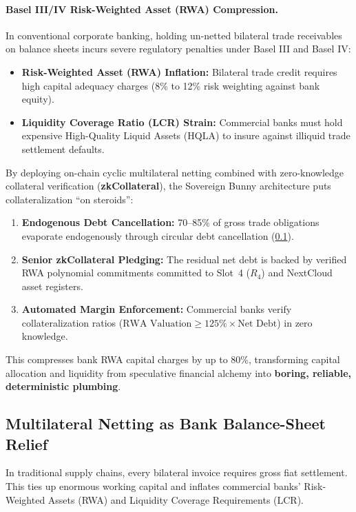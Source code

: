 \documentclass[a4paper,11pt,twoside,parskip=half-,headings=small]{scrartcl}
\begin{document}
\paragraph{Basel III/IV Risk-Weighted Asset (RWA) Compression.}
In conventional corporate banking, holding un-netted bilateral trade receivables on balance sheets incurs
severe regulatory penalties under Basel III and Basel IV:
\begin{itemize}
  \item \textbf{Risk-Weighted Asset (RWA) Inflation:} Bilateral trade credit requires high capital adequacy charges (8\% to 12\% risk weighting against bank equity).
  \item \textbf{Liquidity Coverage Ratio (LCR) Strain:} Commercial banks must hold expensive High-Quality Liquid Assets (HQLA) to insure against illiquid trade settlement defaults.
\end{itemize}

By deploying on-chain cyclic multilateral netting combined with zero-knowledge collateral verification
(\textbf{zkCollateral}), the Sovereign Bunny architecture puts collateralization ``on steroids'':
\begin{enumerate}
  \item \textbf{Endogenous Debt Cancellation:} 70--85\% of gross trade obligations evaporate endogenously through circular debt cancellation (\cref{sec:netting_engine}).
  \item \textbf{Senior zkCollateral Pledging:} The residual net debt is backed by verified RWA polynomial commitments committed to Slot~4 ($R_4$) and NextCloud asset registers.
  \item \textbf{Automated Margin Enforcement:} Commercial banks verify collateralization ratios ($\text{RWA Valuation} \ge 125\% \times \text{Net Debt}$) in zero knowledge.
\end{enumerate}
This compresses bank RWA capital charges by up to 80\%, transforming capital allocation and liquidity from speculative financial alchemy into \textbf{boring, reliable, deterministic plumbing}.

\subsection{Multilateral Netting as Bank Balance-Sheet Relief}
\label{sec:netting_engine}

In traditional supply chains, every bilateral invoice requires gross fiat settlement.
This ties up enormous working capital and inflates commercial banks' Risk-Weighted
Assets (RWA) and Liquidity Coverage Requirements (LCR).
\end{document}

